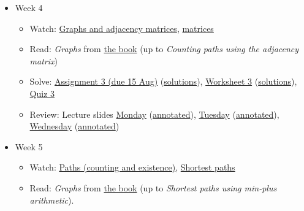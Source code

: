 \documentclass{amsart}
\begin{document}
\begin{itemize}
\begin{itemize}
\end{itemize}
\item Week 4
\begin{itemize}
\item Watch: \href{https://canvas.anu.edu.au/files/725257/}{Graphs and adjacency matrices}, \href{https://canvas.anu.edu.au/files/725259/}{matrices}
\item Read: \emph{Graphs} from  \href{https://canvas.anu.edu.au/files/715877/}{the book} (up to \emph{Counting paths using the adjacency matrix})
\item Solve: \href{https://canvas.anu.edu.au/files/729999/download?download\_frd=1\&verifier=cW8gGsD5kfHF3oSH7eJqXL2vMCC3xyCR32xW89ht}{Assignment 3 (due 15 Aug)} (\href{https://canvas.anu.edu.au/files/764458/download?download\_frd=1\&verifier=BgWBMUmAb5ztfyE5zo8uz858MeXsYyPuAMqIzidm}{solutions}), \href{https://canvas.anu.edu.au/files/741497/download?download\_frd=1\&verifier=NNABH8I4s7UNE1LPuf8YteHPFmwTGhZOuEO76dib}{Worksheet 3} (\href{https://canvas.anu.edu.au/files/757549/download?download\_frd=1\&verifier=nmQVYDUpzcXuuWTWaUWdwIoZQ4P9P4I62wKUurY3}{solutions}), \href{https://canvas.anu.edu.au/files/761355/download?download\_frd=1\&verifier=Xi0SYGFQQ8TwRCcsC3McYRFCtzsFHtl5SmYHq0Xm}{Quiz 3}
\item Review: Lecture slides \href{https://canvas.anu.edu.au/files/738826/download?download\_frd=1\&verifier=O0a5JS1uWpqjlSMcf2WEdw7AHzqiqs1YM7EMSAse}{Monday} (\href{https://canvas.anu.edu.au/files/741827/download?download\_frd=1\&verifier=yFhizS6oN2fyvk5sDL31luTQzKUYfmBvVa1bwROA}{annotated}), \href{https://canvas.anu.edu.au/files/741822/download?download\_frd=1\&verifier=W6AmpTIhyvP8bRe7qKqSaW74IONby8c7MRH4WNBX}{Tuesday} (\href{https://canvas.anu.edu.au/files/744155/download?download\_frd=1\&verifier=YJdMAbY8MPYtVxF0FU3SUwbS8BaEqSloaX60sgQ5}{annotated}), \href{https://canvas.anu.edu.au/files/744163/download?download\_frd=1\&verifier=psr6ionkJZrCXuwjSZnY2d93QrgezAxanh7hCwuI}{Wednesday} (\href{https://canvas.anu.edu.au/files/752099/download?download\_frd=1\&verifier=Ni3txTpLB9rnJgfmSC5KHSfsVqw3UE31l77LfbP5}{annotated})
\end{itemize}
\item Week 5
\begin{itemize}
\item Watch: \href{https://canvas.anu.edu.au/files/738751/}{Paths (counting and existence)}, \href{https://canvas.anu.edu.au/files/738753/}{Shortest paths}
\item Read: \emph{Graphs} from \href{https://canvas.anu.edu.au/files/715877/}{the book} (up to \emph{Shortest paths using min-plus arithmetic}).

\end{itemize}
\end{itemize}
\end{document}
